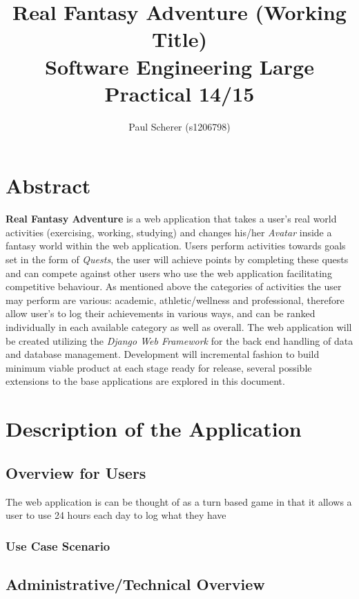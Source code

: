\documentclass[11pt, a4paper]{article}
\begin{document}
\title{Real Fantasy Adventure (Working Title) \\
Software Engineering Large Practical 14/15}
\author{Paul Scherer (s1206798)}
\maketitle
\newpage

\tableofcontents
\newpage

\section{Abstract}
\textbf{Real Fantasy Adventure} is a web application that takes a user's real world activities (exercising, working, studying) and changes his/her \textit{Avatar} inside a fantasy world within the web application. Users perform activities towards goals set in the form of \textit{Quests}, the user will achieve points by completing these quests and can compete against other users who use the web application facilitating competitive behaviour. As mentioned above the categories of activities the user may perform are various: academic, athletic/wellness and professional, therefore allow user's to log their achievements in various ways, and can be ranked individually in each available category as well as overall. The web application will be created utilizing the \textit{Django Web Framework} for the back end handling of data and database management. Development will incremental fashion to build minimum viable product at each stage ready for release, several possible extensions to the base applications are explored in this document.

\section{Description of the Application}
\subsection{Overview for Users}
The web application is can be thought of as a turn based game in that it allows a user to use 24 hours each day to log what they have

\subsubsection{Use Case Scenario}

\subsection{Administrative/Technical Overview}

\section{}
\end{document}
